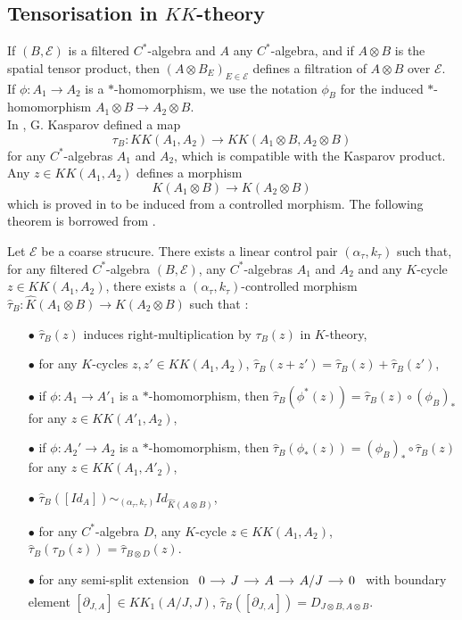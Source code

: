 \subsection{Tensorisation in $KK$-theory}

If $(B,\mathcal E)$ is a filtered $C^*$-algebra and $A$ any $C^*$-algebra, and if $A\otimes B$ is the spatial tensor product, then $(A\otimes B_E)_{E\in\mathcal E}$ defines a filtration of $A\otimes B$ over $\mathcal E$. If $\phi : A_1 \rightarrow A_2$ is a $*$-homomorphism, we use the notation $\phi_B$ for the induced $*$-homomorphism $A_1\otimes B\rightarrow A_2\otimes B$. \\

In \cite{kasparovKKNovikov}, G. Kasparov defined a map
\[\tau_B : KK(A_1,A_2)\rightarrow KK(A_1\otimes B, A_2\otimes B)\]
for any $C^*$-algebras $A_1$ and $A_2$, which is compatible with the Kasparov product. Any $z\in KK(A_1,A_2)$ defines a morphism
\[K(A_1\otimes B)\rightarrow K(A_2\otimes B)\]
which is proved in \cite{OY2} to be induced from a controlled morphism. The following theorem is borrowed from \cite{OY2}.\\

\begin{thm}
Let $\mathcal E$ be a coarse strucure. There exists a linear control pair $(\alpha_\tau,k_\tau)$ such that, for any filtered $C^*$-algebra $(B,\mathcal E)$, any $C^*$-algebras $A_1$ and $A_2$ and any $K$-cycle $z\in KK(A_1,A_2)$, there exists a $(\alpha_\tau,k_\tau)$-controlled morphism $\hat \tau_B : \hat K(A_1\otimes B)\rightarrow \hat K(A_2\otimes B)$
such that :
\begin{itemize}
\item[$\bullet$] $\hat \tau_B(z)$ induces right-multiplication by $\tau_B(z)$ in $K$-theory,
\item[$\bullet$] for any $K$-cycles $z,z'\in KK(A_1,A_2)$, $\hat \tau_B(z+z')=\hat\tau_B(z)+\hat\tau_B(z')$,
\item[$\bullet$] if $\phi : A_1\rightarrow A'_1$ is a $*$-homomorphism, then $\hat\tau_B(\phi^*(z)) =  \hat\tau_B(z)\circ (\phi_B)_*$ for any $z\in KK(A'_1,A_2)$,
\item[$\bullet$] if $\phi : A_2'\rightarrow A_2$ is a $*$-homomorphism, then $\hat\tau_B(\phi_*(z)) = (\phi_B)_*\circ \hat\tau_B(z)$ for any $z\in KK(A_1,A'_2)$,
\item[$\bullet$] $\hat \tau_B([Id_A])\sim_{(\alpha_\tau,k_\tau)} Id_{\hat K(A\otimes B)}$,
\item[$\bullet$] for any $C^*$-algebra $D$, any $K$-cycle $z\in KK(A_1,A_2)$, $\hat\tau_B (\tau_D(z))= \hat\tau_{B\otimes D}(z)$.
\item[$\bullet$] for any semi-split extension $\begin{tikzcd}[column sep = small] 0 \arrow{r}& J \arrow{r} & A \arrow{r} & A/J\arrow{r} & 0\end{tikzcd}$ with boundary element $[\partial_{J,A}]\in KK_1(A/J,J)$, $\hat\tau_B([\partial_{J,A}])=D_{J\otimes B,A\otimes B}$.
\end{itemize}
\end{thm}

